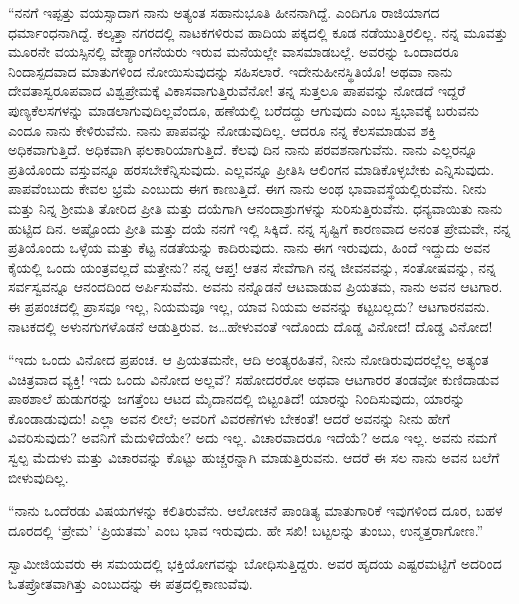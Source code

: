  “ನನಗೆ ಇಪ್ಪತ್ತು ವಯಸ್ಸಾದಾಗ ನಾನು ಅತ್ಯಂತ ಸಹಾನುಭೂತಿ ಹೀನನಾಗಿದ್ದೆ. ಎಂದಿಗೂ ರಾಜಿಯಾಗದ ಧರ್ಮಾಂಧನಾಗಿದ್ದೆ. ಕಲ್ಕತ್ತಾ ನಗರದಲ್ಲಿ ನಾಟಕಗಳಿರುವ ಹಾದಿಯ ಪಕ್ಕದಲ್ಲಿ ಕೂಡ ನಡೆಯುತ್ತಿರಲಿಲ್ಲ. ನನ್ನ ಮೂವತ್ತು ಮೂರನೇ ವಯಸ್ಸಿನಲ್ಲಿ ವೇಶ್ಯಾಂಗನೆಯರು ಇರುವ ಮನೆಯಲ್ಲೇ ವಾಸಮಾಡಬಲ್ಲೆ. ಅವರನ್ನು ಒಂದಾದರೂ ನಿಂದಾಸ್ಪದವಾದ ಮಾತುಗಳಿಂದ ನೋಯಿಸುವುದನ್ನು ಸಹಿಸಲಾರೆ. ಇದೇನು\break ಹೀನಸ್ಥಿತಿಯೊ! ಅಥವಾ ನಾನು ದೇವತಾಸ್ವರೂಪವಾದ ವಿಶ್ವಪ್ರೇಮಕ್ಕೆ ವಿಕಾಸವಾಗುತ್ತಿರು\-ವೆನೋ! ತನ್ನ ಸುತ್ತಲೂ ಪಾಪವನ್ನು ನೋಡದೆ ಇದ್ದರೆ ಪುಣ್ಯಕೆಲಸಗಳನ್ನು ಮಾಡಲಾಗುವುದಿಲ್ಲವೆಂದೂ, ಹಣೆಯಲ್ಲಿ ಬರೆದದ್ದು ಆಗುವುದು ಎಂಬ ಸ್ವಭಾವಕ್ಕೆ ಬರುವನು ಎಂದೂ ನಾನು ಕೇಳಿರುವೆನು. ನಾನು ಪಾಪವನ್ನು ನೋಡುವುದಿಲ್ಲ. ಆದರೂ ನನ್ನ ಕೆಲಸಮಾಡುವ ಶಕ್ತಿ ಅಧಿಕವಾಗುತ್ತಿದೆ. ಅಧಿಕವಾಗಿ ಫಲಕಾರಿಯಾಗುತ್ತಿದೆ. ಕೆಲವು ದಿನ ನಾನು ಪರವಶನಾಗುವೆನು. ನಾನು ಎಲ್ಲರನ್ನೂ ಪ್ರತಿಯೊಂದು ವಸ್ತುವನ್ನೂ ಹರಸಬೇಕೆನ್ನಿಸುವುದು. ಎಲ್ಲವನ್ನೂ ಪ್ರೀತಿಸಿ ಆಲಿಂಗನ ಮಾಡಿಕೊಳ್ಳಬೇಕು ಎನ್ನಿಸುವುದು. ಪಾಪವೆಂಬುದು ಕೇವಲ ಭ್ರಮೆ ಎಂಬುದು ಈಗ ಕಾಣುತ್ತಿದೆ. ಈಗ ನಾನು ಅಂಥ ಭಾವಾವಸ್ಥೆಯಲ್ಲಿರುವೆನು. ನೀನು ಮತ್ತು ನಿನ್ನ ಶ‍್ರೀಮತಿ ತೋರಿದ ಪ್ರೀತಿ ಮತ್ತು ದಯೆಗಾಗಿ ಆನಂದಾಶ್ರುಗಳನ್ನು ಸುರಿಸುತ್ತಿರುವೆನು. ಧನ್ಯವಾಯಿತು ನಾನು ಹುಟ್ಟಿದ ದಿನ. ಅಷ್ಟೊಂದು ಪ್ರೀತಿ ಮತ್ತು ದಯೆ ನನಗೆ ಇಲ್ಲಿ ಸಿಕ್ಕಿದೆ. ನನ್ನ ಸೃಷ್ಟಿಗೆ ಕಾರಣವಾದ ಅನಂತ ಪ್ರೇಮವೇ, ನನ್ನ ಪ್ರತಿಯೊಂದು ಒಳ್ಳೆಯ ಮತ್ತು ಕೆಟ್ಟ ನಡತೆಯನ್ನು ಕಾದಿರುವುದು. ನಾನು ಈಗ ಇರುವುದು, ಹಿಂದೆ ಇದ್ದುದು ಅವನ ಕೈಯಲ್ಲಿ ಒಂದು ಯಂತ್ರವಲ್ಲದೆ ಮತ್ತೇನು? ನನ್ನ ಆಪ್ತ! ಆತನ ಸೇವೆಗಾಗಿ ನನ್ನ ಜೀವನವನ್ನು, ಸಂತೋಷವನ್ನು, ನನ್ನ ಸರ್ವಸ್ವವನ್ನೂ ಆನಂದದಿಂದ ಅರ್ಪಿಸುವೆನು. ಅವನು ನನ್ನೊಡನೆ ಆಟವಾಡುವ ಪ್ರಿಯತಮ, ನಾನು ಅವನ ಆಟಗಾರ. ಈ ಪ್ರಪಂಚದಲ್ಲಿ ಪ್ರಾಸವೂ ಇಲ್ಲ, ನಿಯಮವೂ ಇಲ್ಲ, ಯಾವ ನಿಯಮ ಅವನನ್ನು ಕಟ್ಟಬಲ್ಲದು? ಆಟಗಾರನವನು. ನಾಟಕದಲ್ಲಿ ಅಳುನಗುಗಳೊಡನೆ ಆಡುತ್ತಿರುವ. ಜ…ಹೇಳುವಂತೆ ಇದೊಂದು ದೊಡ್ಡ ವಿನೋದ! ದೊಡ್ಡ ವಿನೋದ! 

 “ಇದು ಒಂದು ವಿನೋದ ಪ್ರಪಂಚ. ಆ ಪ್ರಿಯತಮನೇ, ಆದಿ ಅಂತ್ಯರಹಿತನೆ, ನೀನು ನೋಡಿರುವುದರಲ್ಲೆಲ್ಲ ಅತ್ಯಂತ ವಿಚಿತ್ರವಾದ ವ್ಯಕ್ತಿ! ಇದು ಒಂದು ವಿನೋದ ಅಲ್ಲವೆ? ಸಹೋದರರೋ ಅಥವಾ ಆಟಗಾರರ ತಂಡವೋ ಕುಣಿದಾಡುವ ಪಾಠಶಾಲೆ ಹುಡುಗರನ್ನು ಜಗತ್ತೆಂಬ ಆಟದ ಮೈದಾನದಲ್ಲಿ ಬಿಟ್ಟಂತಿದೆ! ಯಾರನ್ನು ನಿಂದಿಸುವುದು, ಯಾರನ್ನು ಕೊಂಡಾಡುವುದು! ಎಲ್ಲಾ ಅವನ ಲೀಲೆ; ಅವರಿಗೆ ವಿವರಣೆಗಳು ಬೇಕಂತೆ! ಆದರೆ ಅವನನ್ನು ನೀನು ಹೇಗೆ ವಿವರಿಸುವುದು? ಅವನಿಗೆ ಮೆದುಳಿದೆಯೇ? ಅದು ಇಲ್ಲ. ವಿಚಾರವಾದರೂ ಇದೆಯೆ? ಅದೂ ಇಲ್ಲ. ಅವನು ನಮಗೆ ಸ್ವಲ್ಪ ಮೆದುಳು ಮತ್ತು ವಿಚಾರವನ್ನು ಕೊಟ್ಟು ಹುಚ್ಚರನ್ನಾಗಿ ಮಾಡುತ್ತಿರುವನು. ಆದರೆ ಈ ಸಲ ನಾನು ಅವನ ಬಲೆಗೆ ಬೀಳುವುದಿಲ್ಲ.

 “ನಾನು ಒಂದೆರಡು ವಿಷಯಗಳನ್ನು ಕಲಿತಿರುವೆನು. ಆಲೋಚನೆ ಪಾಂಡಿತ್ಯ ಮಾತುಗಾರಿಕೆ ಇವುಗಳಿಂದ ದೂರ, ಬಹಳ ದೂರದಲ್ಲಿ ‘ಪ್ರೇಮ’ ‘ಪ್ರಿಯತಮ’ ಎಂಬ ಭಾವ ಇರುವುದು. ಹೇ ಸಖಿ! ಬಟ್ಟಲನ್ನು ತುಂಬು, ಉನ್ಮತ್ತರಾಗೋಣ.” 

\newpage

 ಸ್ವಾಮೀಜಿಯವರು ಈ ಸಮಯದಲ್ಲಿ ಭಕ್ತಿಯೋಗವನ್ನು ಬೋಧಿಸುತ್ತಿದ್ದರು. ಅವರ ಹೃದಯ ಎಷ್ಟರಮಟ್ಟಿಗೆ ಅದರಿಂದ ಓತಪ್ರೋತವಾಗಿತ್ತು ಎಂಬುದನ್ನು ಈ ಪತ್ರದಲ್ಲಿ\break ಕಾಣುವೆವು. 

